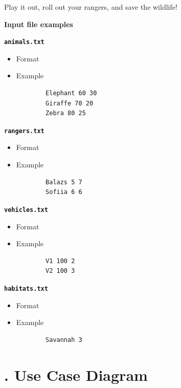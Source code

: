 \documentclass[a4paper,12pt]{article}
\begin{document}
Play it out, roll out your rangers, and save the wildlife!

\bigskip

\textbf{Input file examples}

\textbf{\texttt{animals.txt}}
\begin{itemize}
    \item Format
    \newline {}
    \item Example
    \begin{verbatim}
        Elephant 60 30
        Giraffe 70 20
        Zebra 80 25
    \end{verbatim}
\end{itemize}

\textbf{\texttt{rangers.txt}}
\begin{itemize}
    \item Format
    \newline {}
    \item Example
    \begin{verbatim}
        Balazs 5 7
        Sofiia 6 6
    \end{verbatim}
\end{itemize}

\textbf{\texttt{vehicles.txt}}
\begin{itemize}
    \item Format
    \newline {}
    \item Example
    \begin{verbatim}
        V1 100 2
        V2 100 3
    \end{verbatim}
\end{itemize}

\textbf{\texttt{habitats.txt}}
\begin{itemize}
    \item Format
    \newline {}
    \item Example
    \begin{verbatim}
        Savannah 3
    \end{verbatim}
\end{itemize}

\newpage
\section*{. Use Case Diagram}
\end{document}

